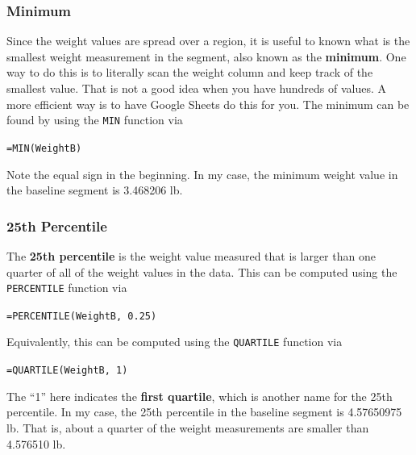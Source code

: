 \subsubsection{Minimum}
Since the weight values are spread over a region, it is useful to known what is the smallest weight measurement in the segment, also known as the \textbf{minimum}. One way to do this is to literally scan the weight column and keep track of the smallest value. That is not a good idea when you have hundreds of values. A more efficient way is to have Google Sheets do this for you. The minimum can be found by using the \texttt{MIN} function via
\begin{center}
    \texttt{=MIN(WeightB)}
\end{center}
Note the equal sign in the beginning. In my case, the minimum weight value in the baseline segment is 3.468206 lb.
\subsubsection{25th Percentile}
The \textbf{25th percentile} is the weight value measured that is larger than one quarter of all of the weight values in the data. This can be computed using the \texttt{PERCENTILE} function via
\begin{center}
    \texttt{=PERCENTILE(WeightB, 0.25)}
\end{center}
Equivalently, this can be computed using the \texttt{QUARTILE} function via
\begin{center}
    \texttt{=QUARTILE(WeightB, 1)}
\end{center}
The ``1'' here indicates the \textbf{first quartile}, which is another name for the 25th percentile. In my case, the 25th percentile in the baseline segment is 4.57650975 lb. That is, about a quarter of the weight measurements are smaller than 4.576510 lb.
